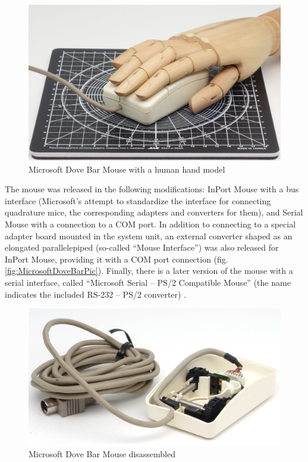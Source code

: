 \documentclass[11pt, a4paper]{article}
\begin{document}
\begin{figure}[h]
    \centering
    \includegraphics[scale=0.5]{1987_microsoft_dove_bar_mouse/hand.jpg}
    \caption{Microsoft Dove Bar Mouse with a human hand model}
    \label{fig:MicrosoftDoveBarHand}
\end{figure}

The mouse was released in the following modifications: InPort Mouse with a bus interface (Microsoft’s attempt to standardize the interface for connecting quadrature mice, the corresponding adapters and converters for them), and Serial Mouse with a connection to a COM port. In addition to connecting to a special adapter board mounted in the system unit, an external converter shaped as an elongated parallelepiped (so-called ``Mouse Interface'') was also released for InPort Mouse, providing it with a COM port connection (fig. \ref{fig:MicrosoftDoveBarPic}). Finally, there is a later version of the mouse with a serial interface, called ``Microsoft Serial -- PS/2 Compatible Mouse'' (the name indicates the included RS-232 -- PS/2 converter) \cite{doveBarDesign2}.

\begin{figure}[h]
    \centering
    \includegraphics[scale=0.6]{1987_microsoft_dove_bar_mouse/inside1_30.jpg}
    \caption{Microsoft Dove Bar Mouse disassembled}
    \label{fig:MicrosoftDoveBarInside}
\end{figure}
\end{document}
